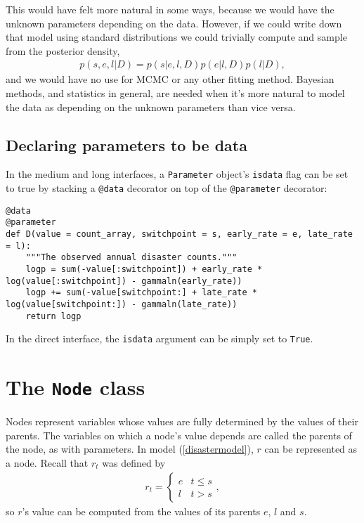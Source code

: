 This would have felt more natural in some ways, because we would have the unknown parameters depending on the data. However, if we could write down that model using standard distributions we could trivially compute and sample from the posterior density,
\begin{eqnarray*}
    p(s,e,l|D) = p(s|e, l, D) p(e|l, D) p(l|D),
\end{eqnarray*}
and we would have no use for MCMC or any other fitting method. Bayesian methods, and statistics in general, are needed when it's more natural to model the data as depending on the unknown parameters than vice versa.

\subsection{Declaring parameters to be data}

In the medium and long interfaces, a \texttt{Parameter} object's \texttt{isdata} flag can be set to true by stacking a \texttt{@data} decorator on top of the \texttt{@parameter} decorator:
\begin{verbatim}
@data
@parameter
def D(value = count_array, switchpoint = s, early_rate = e, late_rate = l):
    """The observed annual disaster counts."""
    logp = sum(-value[:switchpoint]) + early_rate * log(value[:switchpoint]) - gammaln(early_rate))
    logp += sum(-value[switchpoint:] + late_rate * log(value[switchpoint:]) - gammaln(late_rate))
    return logp
\end{verbatim}
In the direct interface, the \texttt{isdata} argument can be simply set to \texttt{True}.


\section{The \texttt{Node} class}\label{node}

Nodes represent variables whose values are fully determined by the values of their parents. The variables on which a node's value depends are called the parents of the node, as with parameters. In model (\ref{disastermodel}), $r$ can be represented as a node. Recall that $r_t$ was defined by
\begin{eqnarray*}
    r_t=\left\{\begin{array}{ll}
        e & t\le s\\ l & t>s
        \end{array}\right.,
\end{eqnarray*}
so $r$'s value can be computed from the values of its parents $e$, $l$ and $s$.

